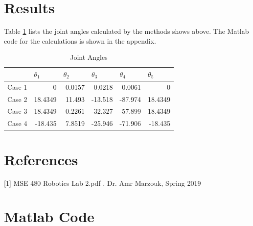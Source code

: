 \documentclass[12pt]{article}
\begin{document}
\section{Results}
Table \ref{tab:results} lists the joint angles calculated by the methods shows above. The Matlab code for the calculations is shown in the appendix.
\begin{table}[htbp]
  \centering
  \caption{Joint Angles}
    \begin{tabular}{|p{3.5em}|rrrrr|}
    \hline
    \multicolumn{1}{|r|}{} & \multicolumn{1}{l}{$\theta_1$} & \multicolumn{1}{l}{$\theta_2$} & \multicolumn{1}{l}{$\theta_3$} & \multicolumn{1}{l}{$\theta_4$} & \multicolumn{1}{l|}{$\theta_5$} \\
    \hline
    Case 1 & 0     & -0.0157 & 0.0218 & -0.0061 & 0 \\
    Case 2 & 18.4349 & 11.493 & -13.518 & -87.974 & 18.4349 \\
    Case 3 & 18.4349 & 0.2261 & -32.327 & -57.899 & 18.4349 \\
    Case 4 & -18.435 & 7.8519 & -25.946 & -71.906 & -18.435 \\
    \hline
    \end{tabular}%
  \label{tab:results}%
\end{table}%

\section{References}
[1] MSE 480 Robotics Lab 2.pdf , Dr. Amr Marzouk, Spring 2019

\pagebreak

\appendix
\section{Matlab Code}

\end{document}
